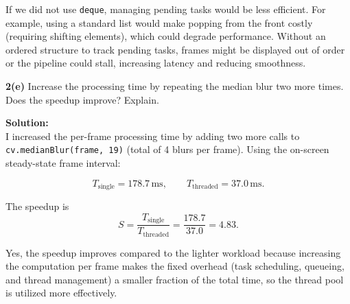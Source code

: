 \documentclass[11pt]{article}
\begin{document}
	If we did not use \texttt{deque}, managing pending tasks would be less efficient. For example, using a standard list would make popping from the front costly (requiring shifting elements), which could degrade performance. Without an ordered structure to track pending tasks, frames might be displayed out of order or the pipeline could stall, increasing latency and reducing smoothness.
	
	\newpage
	\textbf{2(e)} Increase the processing time by repeating the median blur two more times. Does the speedup improve? Explain.
	
	\textbf{Solution:}\\
	I increased the per-frame processing time by adding two more calls to \texttt{cv.medianBlur(frame, 19)} (total of 4 blurs per frame). Using the on-screen steady-state frame interval:
	
	\[
	T_{\text{single}} = 178.7\,\text{ms}, \qquad
	T_{\text{threaded}} = 37.0\,\text{ms}.
	\]
	
	The speedup is
	\[
	S = \frac{T_{\text{single}}}{T_{\text{threaded}}}
	= \frac{178.7}{37.0}
	= 4.83.
	\]
	
	Yes, the speedup improves compared to the lighter workload because increasing the computation per frame makes the fixed overhead (task scheduling, queueing, and thread management) a smaller fraction of the total time, so the thread pool is utilized more effectively.
	
	\newpage
	
\end{document}
